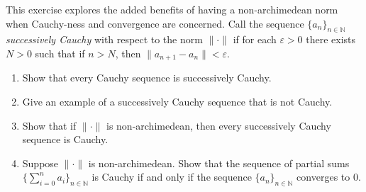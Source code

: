 \documentclass[12 pt, letterpaper]{hmcpset}
\begin{document}
\begin{problem}[(1)]
	This exercise explores the added benefits of having a non-archimedean norm when Cauchy-ness and convergence are concerned. Call the sequence $\{ a_{n} \}_{n \in \mathbb{N}}$ \emph{successively Cauchy} with respect to the norm $\lVert \cdot \rVert$ if for each $\varepsilon > 0$ there exists $N > 0$ such that if  $n > N$, then $\lVert a_{n + 1} - a_{n} \rVert < \varepsilon$.
	\begin{enumerate}
		\item Show that every Cauchy sequence is successively Cauchy.

		\item Give an example of a successively Cauchy sequence that is not Cauchy.

		\item Show that if $\lVert \cdot \rVert$ is non-archimedean, then every successively Cauchy sequence is Cauchy.

		\item Suppose $\lVert \cdot \rVert$ is non-archimedean. Show that the sequence of partial sums $ \{ \sum_{i = 0}^{n} a_{i} \} _{n \in \mathbb{N}}$ is Cauchy if and only if the sequence $\{ a_{n} \}_{n \in \mathbb{N}}$ converges to $0$.
	\end{enumerate}
\end{problem}
\end{document}
